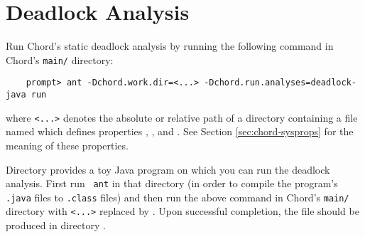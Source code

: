 \section{Deadlock Analysis}
\label{sec:deadlock}

Run Chord's static deadlock analysis by running the following
command in Chord's {\tt main/} directory:

\begin{verbatim}
    prompt> ant -Dchord.work.dir=<...> -Dchord.run.analyses=deadlock-java run
\end{verbatim}

\noindent where {\tt <...>} denotes the absolute or relative path of a directory
containing a file named  which defines
properties , , and
.  See Section \ref{sec:chord-sysprops} for the
meaning of these properties.

Directory  provides a toy Java
program on which you can run the deadlock analysis.  First run {\tt
  ant} in that directory (in order to compile the program's {\tt
  .java} files to {\tt .class} files) and then run the above command
in Chord's {\tt main/} directory with {\tt <...>} replaced by
.  Upon successful completion, the
file  should be produced in directory
.


